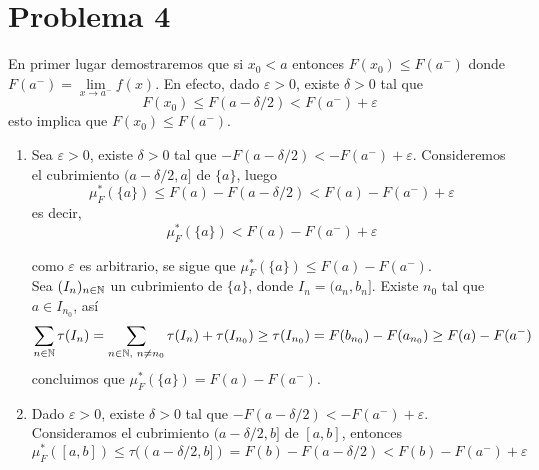 \documentclass{article}
\begin{document}
\section*{Problema 4}
\noindent En primer lugar demostraremos que si $x_{0}<a$ entonces $F(x_{0})\leq F(a^{-})$ donde 
$F(a^{-})=\lim\limits_{x\to a^{-}}f(x)$. En efecto, dado $\varepsilon>0$, existe $\delta>0$ tal que
\begin{equation*}
    F(x_{0})\leq F(a-\delta/2)<F(a^{-})+\varepsilon
\end{equation*}
esto implica que $F(x_{0})\leq F(a^{-})$.
\begin{enumerate}
    \item Sea $\varepsilon>0$, existe $\delta>0$ tal que $-F(a-\delta/2)<-F(a^{-})+\varepsilon$. 
    Consideremos el cubrimiento $(a-\delta/2,a]$ de $\{a\}$, luego
    \begin{equation*}
        \mu_{F}^{*}(\{a\})\leq F(a)-F(a-\delta/2)<F(a)-F(a^{-})+\varepsilon
    \end{equation*}
    es decir,
    \begin{equation*}
        \mu_{F}^{*}(\{a\})<F(a)-F(a^{-})+\varepsilon
    \end{equation*}
    
    como $\varepsilon$ es arbitrario, se sigue que $\mu_{F}^{*}(\{a\})\leq F(a)-F(a^{-})$. 
    \vspace{2mm} \\
    Sea $(I_{n})_{n\in\mathbb{N}}$ un cubrimiento de $\{a\}$, donde $I_{n}=(a_{n},b_{n}]$. Existe $n_{0}$ 
    tal que $a\in I_{n_{0}}$, así
    \begin{equation*}
        \sum_{n\in\mathbb{N}}\tau(I_{n})=\sum_{n\in\mathbb{N},\hspace{1mm}n\neq n_{0}}\tau(I_{n})+\tau(I_{n_{0}})
        \geq\tau(I_{n_{0}})=F(b_{n_{0}})-F(a_{n_{0}})\geq F(a)-F(a^{-})
    \end{equation*}
    concluimos que $\mu_{F}^{*}(\{a\})=F(a)-F(a^{-})$.

    \item Dado $\varepsilon>0$, existe $\delta>0$ tal que $-F(a-\delta/2)<-F(a^{-})+\varepsilon$.
    Consideramos el cubrimiento $(a-\delta/2,b]$ de $[a,b]$, entonces
    \begin{equation*}
        \mu_{F}^{*}([a,b])\leq\tau((a-\delta/2,b])=F(b)-F(a-\delta/2)<F(b)-F(a^{-})+\varepsilon
    \end{equation*}


\end{enumerate}
\end{document}
